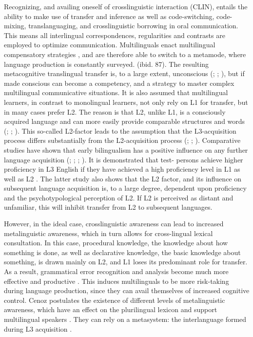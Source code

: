 \documentclass[output=paper]{../langscibook}
\begin{document}
Recognizing, and availing oneself of crosslinguistic interaction (CLIN), entails the ability to make use of transfer and inference as well as code-switching, code-mixing, translanguaging, and crosslinguistic borrowing in oral communication. This means all interlingual correspondences, regularities and contrasts are employed to optimize communication. Multilinguals enact multilingual compensatory strategies \citep[87]{Jessner2006}, and are therefore able to switch to a metamode, where language production is constantly surveyed. (ibid. 87). The resulting metacognitive translingual transfer is, to a large extent, unconscious (\citealt{DeAngelisDewaele2011}; \citealt{GibsonHufeisen2011}; \citealt{Vidgren2013}), but if made conscious can become a competency, and a strategy to master complex multilingual communicative situations. It is also assumed that multilingual learners, in contrast to monolingual learners, not only rely on L1 for transfer, but in many cases prefer L2. The reason is that L2, unlike L1, is a consciously acquired language and can more easily provide comparable structures and words (\citealt[79]{HerdinaJessner2002b}; \citealt[64]{House2004}; \citealt[178f]{Muller-Lance2006}). This so-called L2-factor leads to the assumption that the L3-acquisition process differs substantially from the L2-acquisition process (\citealt{Hufeisen2011}; \citealt{Cenoz2013Influence}; \citealt{HerdinaJessner2002b}). Comparative studies have shown that early bilingualism has a positive influence on any further language acquisition (\citealt{CenozValencia1994}; \citealt{Lasagabaster1997}; \citealt{Pilar_Safont2003}; \citealt{Ringbom1987}). It is demonstrated that test- persons achieve higher proficiency in L3 English if they have achieved a high proficiency level in L1 as well as L2 \citep{DeAngelisJessner2012}. The latter study also shows that the L2 factor, and its influence on subsequent language acquisition is, to a large degree, dependent upon proficiency and the psychotypological perception of L2. If L2 is perceived as distant and unfamiliar, this will inhibit transfer from L2 to subsequent languages. 

However, in the ideal case, crosslinguistic awareness can lead to increased metalinguistic awareness, which in turn allows for cross-lingual lexical consultation. In this case, procedural knowledge, the knowledge about how something is done, as well as declarative knowledge, the basic knowledge about something, is drawn mainly on L2, and L1 loses its predominant role for transfer. As a result, grammatical error recognition and analysis become much more effective and productive \citep{Bialystok2004,GibsonHufeisen2011}. This induces multilinguals to be more risk-taking during language production, since they can avail themselves of increased cognitive control. Cenoz postulates the existence of different levels of metalinguistic awareness, which have an effect on the plurilingual lexicon and support multilingual speakers \citep{Cenoz2013Influence}. They can rely on a metasystem: the interlanguage formed during L3 acquisition \citep[131--161]{HerdinaJessner2002b}. 
\end{document}
